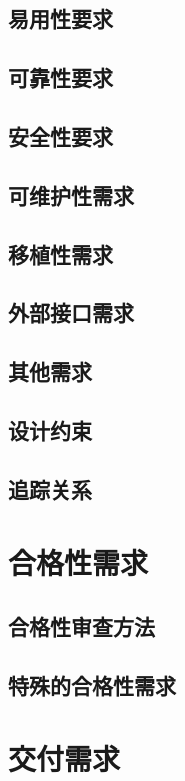 \documentclass[a4paper]{scrreprt}
\begin{document}
\begin{CJK*}{UTF8}{song}
\section{易用性要求}
\section{可靠性要求}
\section{安全性要求}
\section{可维护性需求}
\section{移植性需求}
\section{外部接口需求}
\section{其他需求}
\section{设计约束}
\section{追踪关系}

\chapter{合格性需求}
\section{合格性审查方法}
\section{特殊的合格性需求}

\chapter{交付需求}

\newpage
\end{CJK*}
\end{document}
